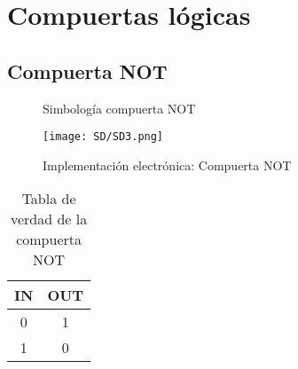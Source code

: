 \documentclass[
	12pt, %
	fleqn, %
	a4paper, %
	oneside, %
]{LegrandOrangeBook}
\begin{document}
\section{Compuertas lógicas}
\subsection{Compuerta NOT}
\begin{figure}[H]
\centering
{}
\caption{Simbología compuerta NOT}
\end{figure}
\begin{figure}[h!]
\centering
\texttt{[image: SD/SD3.png]}
\caption{Implementación electrónica: Compuerta NOT}
\end{figure}
\begin{table}[H]
\begin{center}
\begin{tabular}{|c|c|}
\hline
\rowcolor{color1}
IN & OUT \\ \hline
0  & 1   \\ \hline
1  & 0   \\ \hline
\end{tabular}
\end{center}
\caption{Tabla de verdad de la compuerta NOT}
\label{table:nottable}
\end{table}
\end{document}
